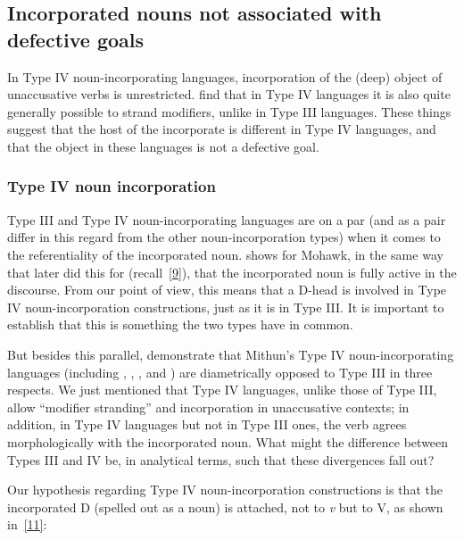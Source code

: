 \documentclass[output=paper]{langsci/langscibook}
\begin{document}
\begin{refcontext}
\subsection{Incorporated nouns not associated with defective goals}
\label{sec:16.2.3}
In Type IV noun-incorporating languages, incorporation of the (deep) object of
unaccusative verbs is unrestricted. \cite{bakeretal05} find that in Type IV
languages it is also quite generally possible to strand modifiers, unlike in
Type III languages. These things suggest that the host of the incorporate is
different in Type IV languages, and that the object in these languages is not a
defective goal.

\subsubsection{Type IV noun incorporation}
Type III and Type IV noun-incorporating languages are on a par (and as a pair
differ in this regard from the other noun-incorporation types) when it comes to
the referentiality of the incorporated noun. \citet[287--8 and sect.
7.4.3]{baker96} shows for Mohawk, in the same way that  \cite{bakeretal05}
later did this for  (recall~\eqref{9}), that the incorporated noun is
fully active in the discourse.  From our point of view, this means that a
D-head is involved in Type IV noun-incorporation constructions, just as it is
in Type III. It is important to establish that this is something the two types
have in common.

But besides this parallel, \cite{bakeretal05} demonstrate that Mithun’s Type IV
noun-incorporating languages (including , ,
, and ) are diametrically opposed to Type III in three respects. We just
mentioned that Type IV languages, unlike those of Type III, allow \enquote{modifier
stranding} and incorporation in unaccusative contexts; in addition, in Type IV
languages but not in Type III ones, the verb agrees morphologically with the
incorporated noun.  What might the difference between Types III and IV be, in
analytical terms, such that these divergences fall out?

Our hypothesis regarding Type IV noun-incorporation constructions is that the
incorporated D (spelled out as a noun) is attached, not to \emph{v} but to V,
as shown in~\eqref{11}:


\end{refcontext}
\end{document}
